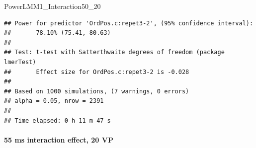 \documentclass[
]{article}
\newenvironment{Shaded}{\begin{snugshade}}{\end{snugshade}}
\newcommand{\AttributeTok}[1]{\textcolor[rgb]{0.77,0.63,0.00}{#1}}
\newcommand{\CommentTok}[1]{\textcolor[rgb]{0.56,0.35,0.01}{\textit{#1}}}
\newcommand{\DecValTok}[1]{\textcolor[rgb]{0.00,0.00,0.81}{#1}}
\newcommand{\FunctionTok}[1]{\textcolor[rgb]{0.00,0.00,0.00}{#1}}
\newcommand{\NormalTok}[1]{#1}
\newcommand{\OtherTok}[1]{\textcolor[rgb]{0.56,0.35,0.01}{#1}}
\newcommand{\SpecialCharTok}[1]{\textcolor[rgb]{0.00,0.00,0.00}{#1}}
\newcommand{\StringTok}[1]{\textcolor[rgb]{0.31,0.60,0.02}{#1}}
\begin{document}
\begin{Shaded}
\end{Shaded}

\begin{Shaded}
\begin{Highlighting}[]
\NormalTok{PowerLMM1\_Interaction50\_20}
\end{Highlighting}
\end{Shaded}

\begin{verbatim}
## Power for predictor 'OrdPos.c:repet3-2', (95% confidence interval):
##       78.10% (75.41, 80.63)
## 
## Test: t-test with Satterthwaite degrees of freedom (package lmerTest)
##       Effect size for OrdPos.c:repet3-2 is -0.028
## 
## Based on 1000 simulations, (7 warnings, 0 errors)
## alpha = 0.05, nrow = 2391
## 
## Time elapsed: 0 h 11 m 47 s
\end{verbatim}

\hypertarget{ms-interaction-effect-20-vp-3}{%
\paragraph{55 ms interaction effect, 20
VP}\label{ms-interaction-effect-20-vp-3}}

\begin{Shaded}
\end{Shaded}
\end{document}
